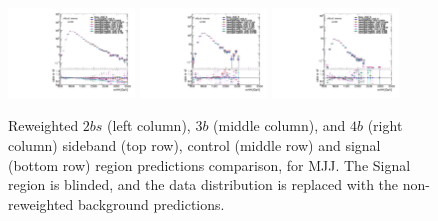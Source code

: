 \begin{figure}[htbp!]
\begin{center}
\includegraphics[width=0.3\textwidth,angle=-90]{figures/boosted/AppendixReweight/Compare/Data_TwoTag_split_Signal_directcompare_mHH_l_1.pdf}
\includegraphics[width=0.3\textwidth,angle=-90]{figures/boosted/AppendixReweight/Compare/Data_ThreeTag_Signal_directcompare_mHH_l_1.pdf}
\includegraphics[width=0.3\textwidth,angle=-90]{figures/boosted/AppendixReweight/Compare/Data_FourTag_Signal_directcompare_mHH_l_1.pdf}
\caption{Reweighted $2bs$ (left column), $3b$ (middle column), and $4b$ (right column) sideband (top row), control (middle row) and signal (bottom row) region predictions comparison, for MJJ. The Signal region is blinded, and the data distribution is replaced with the non-reweighted background predictions.}
\label{fig:app-rw-comp}
\end{center}
\end{figure}

